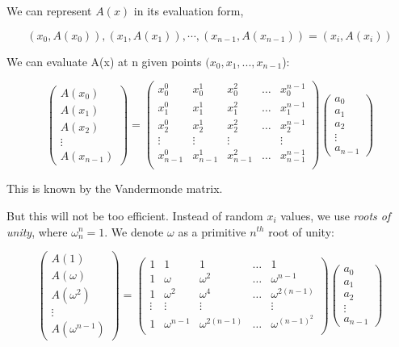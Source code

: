 \documentclass{article}
\theoremstyle{definition}
\begin{document}
We can represent $A(x)$ in its evaluation form,

$$
(x_0, A(x_0)), (x_1, A(x_1)), \cdots, (x_{n-1}, A(x_{n-1})) = (x_i, A(x_i))
$$


We can evaluate A(x) at n given points $(x_0, x_1, ..., x_{n-1}$):

$$
\begin{pmatrix}
A(x_0)\\ A(x_1)\\ A(x_2)\\ \vdots\\ A(x_{n-1})
\end{pmatrix}=
\begin{pmatrix}
x_0^0 & x_0^1 & x_0^2 & \ldots & x_0^{n-1} \\
x_1^0 & x_1^1 & x_1^2 & \ldots & x_1^{n-1} \\
x_2^0 & x_2^1 & x_2^2 & \ldots & x_2^{n-1} \\
\vdots & \vdots & \vdots & & \vdots\\
x_{n-1}^0 & x_{n-1}^1 & x_{n-1}^2 & \ldots & x_{n-1}^{n-1} \\
\end{pmatrix}
\begin{pmatrix}
a_0 \\ a_1 \\ a_2 \\ \vdots \\ a_{n-1}
\end{pmatrix}
$$

This is known by the Vandermonde matrix.

But this will not be too efficient. Instead of random $x_i$ values, we use \emph{roots of unity}, where $\omega_n^n = 1$. We denote $\omega$ as a primitive $n^{th}$ root of unity:

$$
\begin{pmatrix}
A(1)\\ A(\omega)\\ A(\omega^2)\\ \vdots\\ A(\omega^{n-1})
\end{pmatrix}=
\begin{pmatrix}
1 & 1 & 1 & \ldots & 1 \\
1 & \omega & \omega^2 & \ldots & \omega^{n-1} \\
1 & \omega^2 & \omega^4 & \ldots & \omega^{2(n-1)} \\
\vdots & \vdots & \vdots & & \vdots\\
1 & \omega^{n-1} & \omega^{2(n-1)} & \ldots & \omega^{(n-1)^2} \\
\end{pmatrix}
\begin{pmatrix}
a_0 \\ a_1 \\ a_2 \\ \vdots \\ a_{n-1}
\end{pmatrix}
$$
\end{document}
